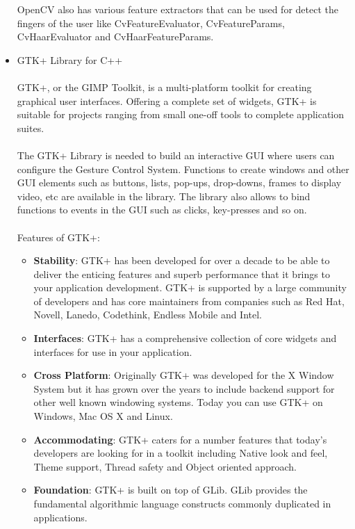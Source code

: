 \documentclass[11pt]{report}
\begin{document}
\begin{itemize}
    OpenCV also has various feature extractors that can be used for detect the fingers of the user like CvFeatureEvaluator, CvFeatureParams, CvHaarEvaluator and CvHaarFeatureParams.
    \item GTK+ Library for C++
    \\
    \\GTK+, or the GIMP Toolkit, is a multi-platform toolkit for creating graphical user interfaces. Offering a complete set of widgets, GTK+ is suitable for projects ranging from small one-off tools to complete application suites.
    \\
    \\The GTK+ Library is needed to build an interactive GUI where users can configure the Gesture Control System. Functions to create windows and other GUI elements such as buttons, lists, pop-ups, drop-downs, frames to display video, etc are available in the library. The library also allows to bind functions to events in the GUI such as clicks, key-presses and so on.
    \\
    \\Features of GTK+:
    \begin{itemize}
        \item \textbf{Stability}: GTK+ has been developed for over a decade to be able to deliver the enticing features and superb performance that it brings to your application development. GTK+ is supported by a large community of developers and has core maintainers from companies such as Red Hat, Novell, Lanedo, Codethink, Endless Mobile and Intel.
        \item \textbf{Interfaces}: GTK+ has a comprehensive collection of core widgets and interfaces for use in your application.
        \item \textbf{Cross Platform}: Originally GTK+ was developed for the X Window System but it has grown over the years to include backend support for other well known windowing systems. Today you can use GTK+ on Windows, Mac OS X and Linux.
        \item \textbf{Accommodating}: GTK+ caters for a number features that today's developers are looking for in a toolkit including Native look and feel, Theme support, Thread safety and Object oriented approach.
        \item \textbf{Foundation}: GTK+ is built on top of GLib. GLib provides the fundamental algorithmic language constructs commonly duplicated in applications.
    \end{itemize}
\end{itemize}
\end{document}
